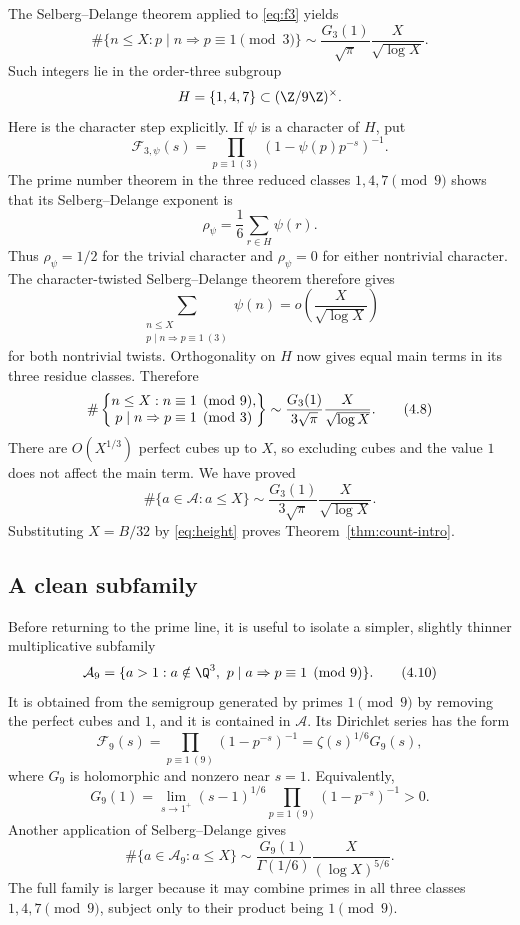 The Selberg--Delange theorem applied to \eqref{eq:f3} yields
\[
 \#\{n\le X:p\mid n\Rightarrow p\equiv1\pmod3\}
 \sim\frac{G_3(1)}{\sqrt\pi}\frac{X}{\sqrt{\log X}}.
 \tag{4.7}
\]
Such integers lie in the order-three subgroup
\[
 H=\{1,4,7\}\subset(\Z/9\Z)^\times.
\]
Here is the character step explicitly.  If \(\psi\) is a character of
\(H\), put
\[
 \mathcal F_{3,\psi}(s)
 =\prod_{p\equiv1\ (3)}
   (1-\psi(p)p^{-s})^{-1}.
\]
The prime number theorem in the three reduced classes \(1,4,7\pmod9\)
shows that its Selberg--Delange exponent is
\[
 \rho_\psi=\frac16\sum_{r\in H}\psi(r).
\]
Thus \(\rho_\psi=1/2\) for the trivial character and
\(\rho_\psi=0\) for either nontrivial character.  The
character-twisted Selberg--Delange theorem therefore gives
\[
 \sum_{\substack{n\le X\\p\mid n\Rightarrow p\equiv1\ (3)}}
 \psi(n)
 =o\left(\frac{X}{\sqrt{\log X}}\right)
\]
for both nontrivial twists.  Orthogonality on \(H\) now gives equal main
terms in its three residue classes.  Therefore
\[
 \#\left\{
 \begin{array}{@{}c@{}}
 n\le X:n\equiv1\pmod9,\\
 p\mid n\Rightarrow p\equiv1\pmod3
 \end{array}
 \right\}
 \sim
 \frac{G_3(1)}{3\sqrt\pi}\frac{X}{\sqrt{\log X}}.
 \tag{4.8}
\]
There are \(O(X^{1/3})\) perfect cubes up to \(X\), so excluding cubes and
the value \(1\) does not affect the main term.  We have proved
\[
 \#\{a\in\mathcal A:a\le X\}
 \sim
 \frac{G_3(1)}{3\sqrt\pi}\frac{X}{\sqrt{\log X}}.
 \tag{4.9}
\]
Substituting \(X=B/32\) by \eqref{eq:height} proves
Theorem~\ref{thm:count-intro}.

\subsection{A clean subfamily}

Before returning to the prime line, it is useful to isolate a simpler,
slightly thinner multiplicative subfamily
\[
 \mathcal A_9=
 \{a>1:a\notin\Q^3,\ p\mid a\Rightarrow p\equiv1\pmod9\}.
 \tag{4.10}
\]
It is obtained from the semigroup generated by primes \(1\pmod9\) by
removing the perfect cubes and \(1\), and it is contained in
\(\mathcal A\).  Its Dirichlet
series has the form
\[
 \mathcal F_9(s)
 =\prod_{p\equiv1\ (9)}(1-p^{-s})^{-1}
 =\zeta(s)^{1/6}G_9(s),
 \tag{4.11}
\]
where \(G_9\) is holomorphic and nonzero near \(s=1\).  Equivalently,
\[
 G_9(1)=
 \lim_{s\to1^+}(s-1)^{1/6}
 \prod_{p\equiv1\ (9)}(1-p^{-s})^{-1}>0.
 \tag{4.12}
\]
Another application of Selberg--Delange gives
\[
 \#\{a\in\mathcal A_9:a\le X\}
 \sim
 \frac{G_9(1)}{\Gamma(1/6)}
 \frac{X}{(\log X)^{5/6}}.
 \tag{4.13}
\]
The full family is larger because it may combine primes in all three
classes \(1,4,7\pmod9\), subject only to their product being \(1\pmod9\).

